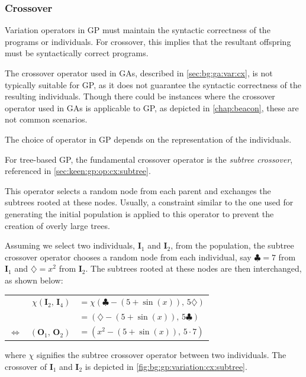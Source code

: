 \subsubsection{Crossover}
\label{sec:bg:gp:var:cx}
  Variation operators in GP must maintain the syntactic correctness of the 
  programs or individuals.
  For crossover, this implies that the resultant offspring must be syntactically
  correct programs.

  The crossover operator used in GAs, described in \vref{sec:bg:ga:var:cx}, is
  not typically suitable for GP, as it does not guarantee the syntactic 
  correctness of the resulting individuals.
  Though there could be instances where the crossover operator used in GAs is
  applicable to GP, as depicted in \vref{chap:beacon}, these are not common
  scenarios.

  The choice of operator in GP depends on the representation of the individuals.

  For tree-based GP, the fundamental crossover operator is the \emph{subtree 
  crossover}, referenced in \vref{sec:keen:gp:op:cx:subtree}.

  This operator selects a random node from each parent and exchanges the 
  subtrees rooted at these nodes.
  Usually, a constraint similar to the one used for generating the initial
  population is applied to this operator to prevent the creation of overly large
  trees.

  Assuming we select two individuals, \(\mathbf{I}_1\) and \(\mathbf{I}_2\), 
  from the population, the subtree crossover operator chooses a random node from 
  each individual, say \(\clubsuit = 7\) from \(\mathbf{I}_1\) and 
  \(\diamondsuit = x^2\) from \(\mathbf{I}_2\).
  The subtrees rooted at these nodes are then interchanged, as shown below:

  \begin{table}[H]
    \centering
    \begin{tabular}{rrl}                    
        & \(\chi(\mathbf{I}_2,\,\mathbf{I}_4)\)
        & \(= \chi(\clubsuit - (5 + \sin(x)),\,5\diamondsuit)\)
      \\
        &   
        & \(= (\diamondsuit - (5 + \sin(x)),\,5\clubsuit)\)
      \\
      \(\Leftrightarrow\)
        & \((\mathbf{O}_1,\,\mathbf{O}_2)\)
        & \(= (x^2 - (5 + \sin(x)),\,5 \cdot 7)\)
    \end{tabular}
  \end{table}

  where \(\chi\) signifies the subtree crossover operator between two 
  individuals.
  The crossover of \(\mathbf{I}_1\) and \(\mathbf{I}_2\) is depicted in
  \vref{fig:bg:gp:variation:cx:subtree}.

